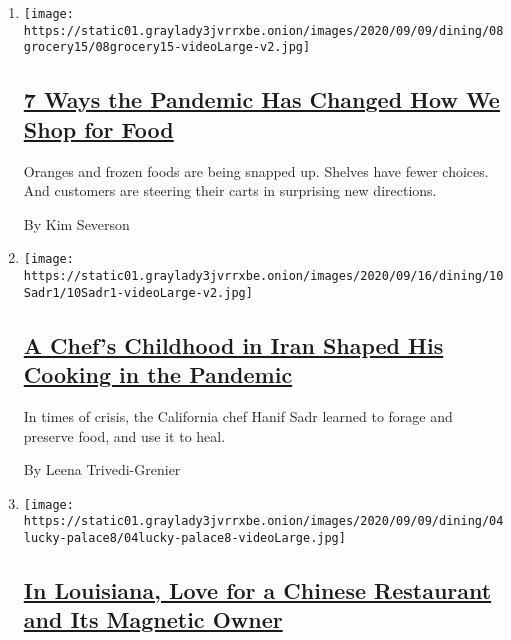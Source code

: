\begin{enumerate}
\def\labelenumi{\arabic{enumi}.}
\item
  \texttt{[image: https://static01.graylady3jvrrxbe.onion/images/2020/09/09/dining/08grocery15/08grocery15-videoLarge-v2.jpg]}

  \hypertarget{7-ways-the-pandemic-has-changed-how-we-shop-for-food}{%
  \subsection{\texorpdfstring{\href{/2020/09/08/dining/grocery-shopping-coronavirus.html}{7
  Ways the Pandemic Has Changed How We Shop for
  Food}}{7 Ways the Pandemic Has Changed How We Shop for Food}}\label{7-ways-the-pandemic-has-changed-how-we-shop-for-food}}

  Oranges and frozen foods are being snapped up. Shelves have fewer
  choices. And customers are steering their carts in surprising new
  directions.

  By Kim Severson
\item
  \texttt{[image: https://static01.graylady3jvrrxbe.onion/images/2020/09/16/dining/10Sadr1/10Sadr1-videoLarge-v2.jpg]}

  \hypertarget{a-chefs-childhood-in-iran-shaped-his-cooking-in-the-pandemic}{%
  \subsection{\texorpdfstring{\href{/2020/09/10/dining/iranian-food-foraging-hanif-sadr.html}{A
  Chef's Childhood in Iran Shaped His Cooking in the
  Pandemic}}{A Chef's Childhood in Iran Shaped His Cooking in the Pandemic}}\label{a-chefs-childhood-in-iran-shaped-his-cooking-in-the-pandemic}}

  In times of crisis, the California chef Hanif Sadr learned to forage
  and preserve food, and use it to heal.

  By Leena Trivedi-Grenier
\item
  \texttt{[image: https://static01.graylady3jvrrxbe.onion/images/2020/09/09/dining/04lucky-palace8/04lucky-palace8-videoLarge.jpg]}

  \hypertarget{in-louisiana-love-for-a-chinese-restaurant-and-its-magnetic-owner}{%
  \subsection{\texorpdfstring{\href{/2020/09/04/dining/lucky-palace-bossier-city-louisiana-restaurant.html}{In
  Louisiana, Love for a Chinese Restaurant and Its Magnetic
  Owner}}{In Louisiana, Love for a Chinese Restaurant and Its Magnetic Owner}}\label{in-louisiana-love-for-a-chinese-restaurant-and-its-magnetic-owner}}


\end{enumerate}
